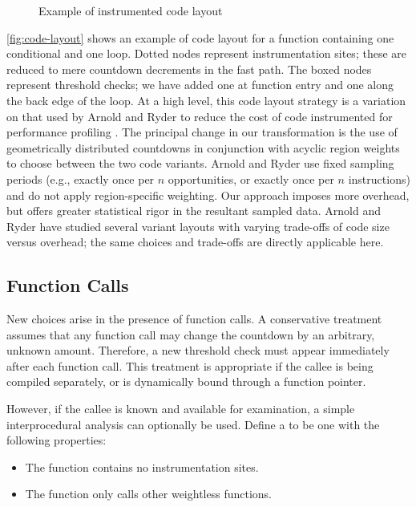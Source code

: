 \begin{figure}
  \centering
  
  \caption{Example of instrumented code layout}
  \label{fig:code-layout}
\end{figure}

\autoref{fig:code-layout} shows an example of code layout for a
function containing one conditional and one loop.  Dotted nodes
represent instrumentation sites; these are reduced to mere countdown
decrements in the fast path.  The boxed nodes represent threshold
checks; we have added one at function entry and one along the back
edge of the loop.  At a high level, this code layout strategy is a
variation on that used by Arnold and Ryder to reduce the cost of code
instrumented for performance profiling \cite{Arnold:2001:FRC}.  The
principal change in our transformation is the use of geometrically
distributed countdowns in conjunction with acyclic region weights to
choose between the two code variants.  Arnold and Ryder use fixed
sampling periods (e.g., exactly once per $n$ opportunities, or exactly
once per $n$ instructions) and do not apply region-specific weighting.
Our approach imposes more overhead, but offers greater statistical
rigor in the resultant sampled data.  Arnold and Ryder have studied
several variant layouts with varying trade-offs of code size versus
overhead; the same choices and trade-offs are directly applicable
here.


\subsection{Function Calls}

New choices arise in the presence of function calls.  A conservative
treatment assumes that any function call may change the countdown by
an arbitrary, unknown amount.  Therefore, a new threshold check must
appear immediately after each function call.  This treatment is
appropriate if the callee is being compiled separately, or is
dynamically bound through a function pointer.

However, if the callee is known and available for examination, a
simple interprocedural analysis can optionally be used.  Define a
 to be one with the following properties:

\begin{itemize}
\item The function contains no instrumentation sites.
\item The function only calls other weightless functions.
\end{itemize}

